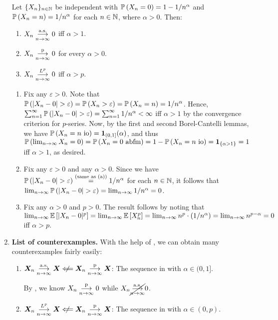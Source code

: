 \begin{enumerate}
\begin{lemma}
\label{lma:indp-two-pt-dist}
Let \(\{X_n\}_{n\in\mathbb{N}}\) be independent with \(\mathbb{P}\left(X_n=0\right)=1-1/n^{\alpha}\)
and \(\mathbb{P}\left(X_n=n\right)=1/n^{\alpha}\) for each \(n\in\mathbb{N}\), where \(\alpha>0\). Then:
\begin{enumerate}
\item \(X_n\underset{n\to\infty}{\overset{\text{a.s.}}{\longrightarrow}} 0\) iff \(\alpha>1\).
\item \(X_n\underset{n\to\infty}{\overset{\text{p}}{\longrightarrow}} 0\) for every \(\alpha>0\).
\item \(X_n\underset{n\to\infty}{\overset{L^p}{\longrightarrow}} 0\) iff \(\alpha>p\).
\end{enumerate}
\end{lemma}
\begin{pf}
\begin{enumerate}
\item Fix any \(\varepsilon>0\). Note that
\(\prob{|X_n-0|>\varepsilon}=\prob{X_n>\varepsilon}=\prob{X_n=n}=1/n^{\alpha}\).
Hence,
\(\sum_{n=1}^{\infty}\prob{|X_n-0|>\varepsilon}=\sum_{n=1}^{\infty}1/n^{\alpha}<\infty\)
iff \(\alpha>1\) by the convergence criterion for \(p\)-series.
Now, by the first and second Borel-Cantelli lemmas, we have \(\mathbb{P}\left(X_n=n\text{ io}\right)
=\mathbf{1}_{(0,1]}(\alpha)\), and thus \(\mathbb{P}\left(\lim_{n\to\infty}X_n=0\right)
=\mathbb{P}\left(X_n=0\text{ abfm}\right)=1-\mathbb{P}\left(X_n=n\text{ io}\right)=\mathbf{1}_{\left\{\alpha>1\right\}}=1\) iff
\(\alpha>1\), as desired.
\item Fix any \(\varepsilon>0\) and any \(\alpha>0\). Since we have
\(\prob{|X_n-0|>\varepsilon}\overset{\text{(same as (a))}}{=}1/n^{\alpha}\) for
each \(n\in\mathbb{N}\), it follows that
\(\lim_{n\to\infty}\prob{|X_n-0|>\varepsilon}=\lim_{n\to\infty}1/n^{\alpha}=0\).
\item Fix any \(\alpha>0\) and \(p>0\). The result follows by noting that
\(\lim_{n\to\infty}\mathbb{E}\left[|X_n-0|^{p}\right]=\lim_{n\to\infty}\mathbb{E}\left[X_n^{p}\right]=\lim_{n\to\infty}n^p\cdot
(1/n^{\alpha})=\lim_{n\to\infty}n^{p-\alpha}=0\) iff \(\alpha>p\).
\end{enumerate}
\end{pf}
\item \textbf{List of counterexamples.} With the help of
, we can obtain many counterexamples fairly easily:
\begin{enumerate}[label={(\arabic*)}]
\item \(\vect{X}_n\toas \vect{X}\centernot\Longleftarrow \vect{X}_n\topr\vect{X}\):
The sequence in  with \(\alpha\in (0,1]\).

\begin{pf}
By , we know \(X_n\underset{n\to\infty}{\overset{\text{p}}{\longrightarrow}} 0\) while
\(X_n\cancel{\underset{n\to\infty}{\overset{\text{a.s.}}{\longrightarrow}}}0\).
\end{pf}
\item \(\vect{X}_n\tolp \vect{X}\centernot\Longleftarrow \vect{X}_n\topr\vect{X}\):
The sequence in  with \(\alpha\in (0,p)\).



\end{enumerate}
\end{enumerate}
